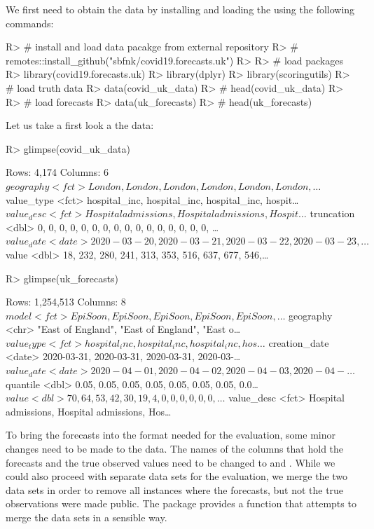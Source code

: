 \documentclass[article]{jss}
\begin{document}
We first need to obtain the data by installing and loading the  using the following commands: 
% 
\begin{Schunk}
\begin{Sinput}
R> # install and load data pacakge from external repository
R> # remotes::install_github("sbfnk/covid19.forecasts.uk")
R> 
R> # load packages
R> library(covid19.forecasts.uk)
R> library(dplyr)
R> library(scoringutils)
R> # load truth data
R> data(covid_uk_data)
R> # head(covid_uk_data)
R> 
R> # load forecasts
R> data(uk_forecasts)
R> # head(uk_forecasts)
\end{Sinput}
\end{Schunk}
% 
Let us take a first look a the data:
% 
\begin{Schunk}
\begin{Sinput}
R> glimpse(covid_uk_data)
\end{Sinput}
\begin{Soutput}
Rows: 4,174
Columns: 6
$ geography  <fct> London, London, London, London, London, London, …
$ value_type <fct> hospital_inc, hospital_inc, hospital_inc, hospit…
$ value_desc <fct> Hospital admissions, Hospital admissions, Hospit…
$ truncation <dbl> 0, 0, 0, 0, 0, 0, 0, 0, 0, 0, 0, 0, 0, 0, 0, 0, …
$ value_date <date> 2020-03-20, 2020-03-21, 2020-03-22, 2020-03-23,…
$ value      <dbl> 18, 232, 280, 241, 313, 353, 516, 637, 677, 546,…
\end{Soutput}
\begin{Sinput}
R> glimpse(uk_forecasts)
\end{Sinput}
\begin{Soutput}
Rows: 1,254,513
Columns: 8
$ model         <fct> EpiSoon, EpiSoon, EpiSoon, EpiSoon, EpiSoon, …
$ geography     <chr> "East of England", "East of England", "East o…
$ value_type    <fct> hospital_inc, hospital_inc, hospital_inc, hos…
$ creation_date <date> 2020-03-31, 2020-03-31, 2020-03-31, 2020-03-…
$ value_date    <date> 2020-04-01, 2020-04-02, 2020-04-03, 2020-04-…
$ quantile      <dbl> 0.05, 0.05, 0.05, 0.05, 0.05, 0.05, 0.05, 0.0…
$ value         <dbl> 70, 64, 53, 42, 30, 19, 4, 0, 0, 0, 0, 0, 0, …
$ value_desc    <fct> Hospital admissions, Hospital admissions, Hos…
\end{Soutput}
\end{Schunk}
% 
To bring the forecasts into the format needed for the evaluation, some minor changes need to be made to the data. The names of the columns that hold the forecasts and the true observed values need to be changed to  and . While we could also proceed with separate data sets for the evaluation, we merge the two data sets in order to remove all instances where the forecasts, but not the true observations were made public. The  package provides a function that attempts to merge the data sets in a sensible way. 
\end{document}

